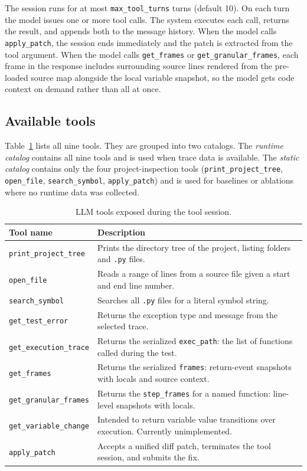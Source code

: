 The session runs for at most \texttt{max\_tool\_turns} turns (default 10). On each turn the model issues one or more tool calls. The system executes each call, returns the result, and appends both to the message history. When the model calls \texttt{apply\_patch}, the session ends immediately and the patch is extracted from the tool argument. When the model calls \texttt{get\_frames} or \texttt{get\_granular\_frames}, each frame in the response includes surrounding source lines rendered from the pre-loaded source map alongside the local variable snapshot, so the model gets code context on demand rather than all at once.

\subsection{Available tools}
\label{subsec:tools}

Table~\ref{tab:tools} lists all nine tools. They are grouped into two catalogs. The \emph{runtime catalog} contains all nine tools and is used when trace data is available. The \emph{static catalog} contains only the four project-inspection tools (\texttt{print\_project\_tree}, \texttt{open\_file}, \texttt{search\_symbol}, \texttt{apply\_patch}) and is used for baselines or ablations where no runtime data was collected.

\begin{table}[ht]
\centering
\caption{LLM tools exposed during the tool session.}
\label{tab:tools}
\begin{tabular}{@{}lp{8.2cm}@{}}
\toprule
\textbf{Tool name} & \textbf{Description} \\
\midrule
\texttt{print\_project\_tree}  & Prints the directory tree of the project, listing folders and \texttt{.py} files. \\
\texttt{open\_file}            & Reads a range of lines from a source file given a start and end line number. \\
\texttt{search\_symbol}        & Searches all \texttt{.py} files for a literal symbol string. \\
\texttt{get\_test\_error}      & Returns the exception type and message from the selected trace. \\
\texttt{get\_execution\_trace} & Returns the serialized \texttt{exec\_path}: the list of functions called during the test. \\
\texttt{get\_frames}           & Returns the serialized \texttt{frames}: return-event snapshots with locals and source context. \\
\texttt{get\_granular\_frames} & Returns the \texttt{step\_frames} for a named function: line-level snapshots with locals. \\
\texttt{get\_variable\_change} & Intended to return variable value transitions over execution. Currently unimplemented. \\
\texttt{apply\_patch}          & Accepts a unified diff patch, terminates the tool session, and submits the fix. \\
\bottomrule
\end{tabular}
\end{table}

